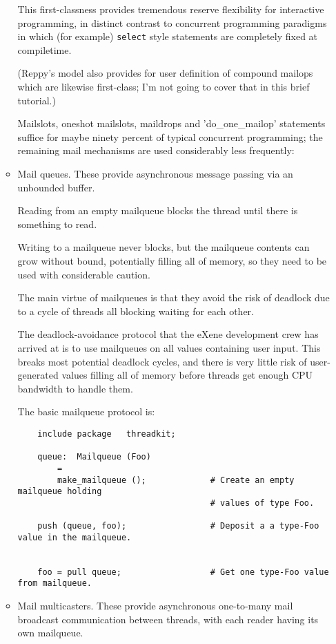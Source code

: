 \begin{itemize}
\begin{itemize}
This first-classness provides tremendous reserve flexibility 
for interactive programming, in distinct contrast to 
concurrent programming paradigms in which (for example) 
{\tt select} style statements are completely fixed at compiletime.

(Reppy's model also provides for user definition of compound 
mailops which are likewise first-class;  I'm not going to 
cover that in this brief tutorial.) 


Mailslots, oneshot mailslots, 
maildrops and 'do\_one\_mailop' statements 
suffice for maybe ninety percent of typical 
 concurrent programming;  the 
remaining mail mechanisms are used 
considerably less frequently: 

\item 
Mail queues.  These provide asynchronous 
message passing via an unbounded buffer. 

Reading from an empty mailqueue blocks 
the thread until there is something to 
read. 

Writing to a mailqueue never blocks, 
but the mailqueue contents can grow without 
bound, potentially filling all of memory, 
so they need to be used with considerable 
caution. 

The main virtue of mailqueues is that they 
avoid the risk of deadlock due to a cycle 
of threads all blocking waiting for each 
other. 

The deadlock-avoidance protocol that the 
eXene development crew has arrived at is 
to use mailqueues on all values containing 
user input.  This breaks most potential 
deadlock cycles, and there is very little 
risk of user-generated values filling all 
of memory before threads get enough CPU 
bandwidth to handle them. 

The basic mailqueue protocol is: 

\begin{verbatim}
    include package   threadkit;

    queue:  Mailqueue (Foo)
        =
        make_mailqueue ();             # Create an empty mailqueue holding
                                       # values of type Foo.

    push (queue, foo);                 # Deposit a a type-Foo value in the mailqueue.


    foo = pull queue;                  # Get one type-Foo value from mailqueue.
\end{verbatim}


\item 
Mail multicasters.  These provide asynchronous 
one-to-many mail broadcast communication between 
threads, with each reader having its own mailqueue. 


\end{itemize}
\end{itemize}
